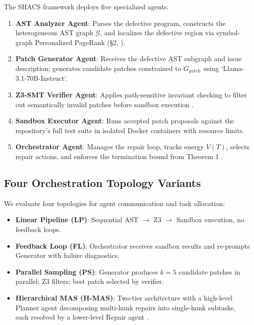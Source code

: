 \documentclass[10pt,twocolumn,letterpaper]{article}
\begin{document}
The SHACS framework deploys five specialized agents:

\begin{enumerate}
  \item \textbf{AST Analyzer Agent}: Parses the defective program, constructs the heterogeneous AST graph $\mathcal{G}$, and localizes the defective region via symbol-graph Personalized PageRank (\S{}2, \cite{crossref_10_1145_3689096_3689462}).
  \item \textbf{Patch Generator Agent}: Receives the defective AST subgraph and issue description; generates candidate patches constrained to $G_{\text{patch}}$ using `Llama-3.1-70B-Instruct`.
  \item \textbf{Z3-SMT Verifier Agent}: Applies path-sensitive invariant checking to filter out semantically invalid patches before sandbox execution \cite{arxiv_2404_01131}.
  \item \textbf{Sandbox Executor Agent}: Runs accepted patch proposals against the repository's full test suite in isolated Docker containers with resource limits.
  \item \textbf{Orchestrator Agent}: Manages the repair loop, tracks energy $V(T)$, selects repair actions, and enforces the termination bound from Theorem 1 \cite{arxiv_2412_06333}.
\end{enumerate}


\subsection{Four Orchestration Topology Variants}


We evaluate four topologies for agent communication and task allocation:

\begin{itemize}
  \item \textbf{Linear Pipeline (LP)}: Sequential AST $\rightarrow$ Z3 $\rightarrow$ Sandbox execution, no feedback loops.
  \item \textbf{Feedback Loop (FL)}: Orchestrator receives sandbox results and re-prompts Generator with failure diagnostics.
  \item \textbf{Parallel Sampling (PS)}: Generator produces $k = 5$ candidate patches in parallel; Z3 filters; best patch selected by verifier.
  \item \textbf{Hierarchical MAS (H-MAS)}: Two-tier architecture with a high-level Planner agent decomposing multi-hunk repairs into single-hunk subtasks, each resolved by a lower-level Repair agent \cite{arxiv_2412_06333}.
\end{itemize}
\end{document}
